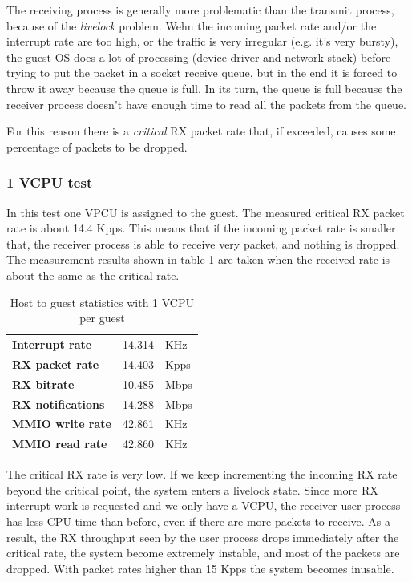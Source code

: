 \vspace{0.5cm}

The receiving process is generally more problematic than the transmit process, because of the \emph{livelock} problem.
Wehn the incoming packet rate and/or the interrupt rate are too high, or the traffic is very irregular (e.g. it's very bursty), the guest
OS does a lot of processing (device driver and network stack) before trying to put the packet in a socket receive queue, but in the end it
is forced to throw it away because the queue is full. In its turn, the queue is full because the receiver process doesn't have enough
time to read all the packets from the queue.

For this reason there is a \emph{critical} RX packet rate that, if exceeded, causes some percentage of packets to be dropped.


\subsubsection{1 VCPU test}
\label{sec:e1000-rx-g2h1vcpu}
In this test one VPCU is assigned to the guest. The measured critical RX packet rate is about 14.4 Kpps.
This means that if the incoming packet rate is smaller that, the receiver process is able to receive very packet, and nothing is dropped.
The measurement results shown in table \ref{tab:e1000-rx-g2h1vcpu} are taken when the received rate is about the same as the critical
rate.

\begin{table}
\begin{center}
\begin{tabular}{lrl}
\toprule
\textbf{Interrupt rate} & 14.314 & KHz\\
\textbf{RX packet rate} & 14.403 & Kpps\\
\textbf{RX bitrate} & 10.485 & Mbps\\
\textbf{RX notifications} & 14.288 & Mbps\\
\textbf{MMIO write rate} & 42.861 & KHz\\
\textbf{MMIO read rate} & 42.860 & KHz\\
\bottomrule
\end{tabular}
\end{center}
\caption[H2G with 1VCPU per guest]{Host to guest statistics with 1 VCPU per guest}
\label{tab:e1000-rx-g2h1vcpu}
\end{table}

The critical RX rate is very low. If we keep incrementing the incoming RX rate beyond the critical point, the system enters a livelock 
state. Since more RX interrupt work is requested and we only have a VCPU, the receiver user process has less CPU time than before, even
if there are more packets to receive. As a result, the RX throughput seen by the user process drops immediately after the critical rate,
the system become extremely instable, and most of the packets are dropped. With packet rates higher than 15 Kpps the system becomes
inusable.

